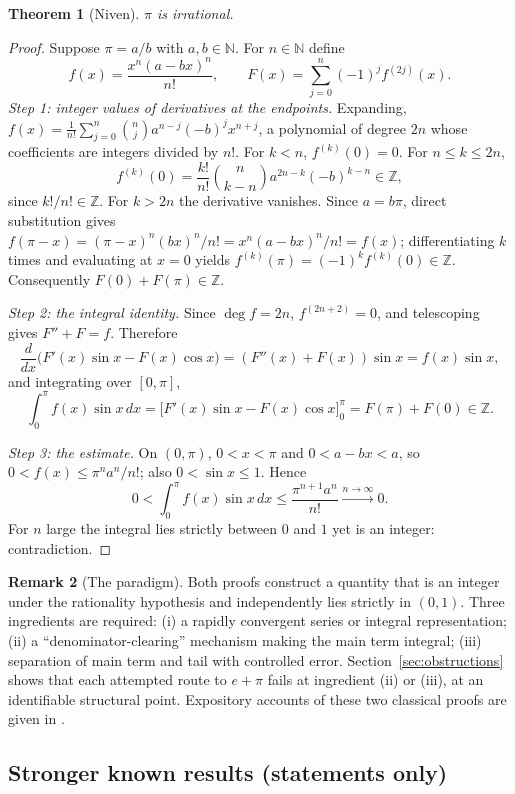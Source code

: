 \documentclass[11pt]{amsart}
\newtheorem{theorem}{Theorem}[section]
\theoremstyle{definition}
\newtheorem{remark}[theorem]{Remark}
\theoremstyle{remark}
\numberwithin{equation}{section}
\newcommand{\Z}{\mathbb{Z}}
\newcommand{\N}{\mathbb{N}}
\begin{document}
\begin{theorem}[Niven]\label{thm:niven}
$\pi$ is irrational.
\end{theorem}

\begin{proof}
Suppose $\pi=a/b$ with $a,b\in\N$. For $n\in\N$ define
\[
f(x)=\frac{x^n(a-bx)^n}{n!},\qquad F(x)=\sum_{j=0}^{n}(-1)^j f^{(2j)}(x).
\]
\emph{Step 1: integer values of derivatives at the endpoints.} Expanding, $f(x)=\frac{1}{n!}\sum_{j=0}^n\binom{n}{j}a^{n-j}(-b)^j x^{n+j}$, a polynomial of degree $2n$ whose coefficients are integers divided by $n!$. For $k<n$, $f^{(k)}(0)=0$. For $n\le k\le 2n$,
\[
f^{(k)}(0)=\frac{k!}{n!}\binom{n}{k-n}a^{2n-k}(-b)^{k-n}\in\Z,
\]
since $k!/n!\in\Z$. For $k>2n$ the derivative vanishes. Since $a=b\pi$, direct substitution gives $f(\pi-x)=(\pi-x)^n(bx)^n/n!=x^n(a-bx)^n/n!=f(x)$; differentiating $k$ times and evaluating at $x=0$ yields $f^{(k)}(\pi)=(-1)^k f^{(k)}(0)\in\Z$. Consequently $F(0)+F(\pi)\in\Z$.

\emph{Step 2: the integral identity.} Since $\deg f=2n$, $f^{(2n+2)}=0$, and telescoping gives $F''+F=f$. Therefore
\[
\frac{d}{dx}\bigl(F'(x)\sin x-F(x)\cos x\bigr)=(F''(x)+F(x))\sin x=f(x)\sin x,
\]
and integrating over $[0,\pi]$,
\[
\int_0^\pi f(x)\sin x\,dx=\bigl[F'(x)\sin x-F(x)\cos x\bigr]_0^\pi=F(\pi)+F(0)\in\Z.
\]

\emph{Step 3: the estimate.} On $(0,\pi)$, $0<x<\pi$ and $0<a-bx<a$, so $0<f(x)\le\pi^n a^n/n!$; also $0<\sin x\le1$. Hence
\[
0<\int_0^\pi f(x)\sin x\,dx\le\frac{\pi^{n+1}a^n}{n!}\xrightarrow{n\to\infty}0.
\]
For $n$ large the integral lies strictly between $0$ and $1$ yet is an integer: contradiction.
\end{proof}

\begin{remark}[The paradigm]\label{rem:paradigm}
Both proofs construct a quantity that is an integer under the rationality hypothesis and independently lies strictly in $(0,1)$. Three ingredients are required: (i) a rapidly convergent series or integral representation; (ii) a ``denominator-clearing'' mechanism making the main term integral; (iii) separation of main term and tail with controlled error. Section~\ref{sec:obstructions} shows that each attempted route to $e+\pi$ fails at ingredient (ii) or (iii), at an identifiable structural point. Expository accounts of these two classical proofs are given in \cite{Conrad}.
\end{remark}

\subsection{Stronger known results (statements only)}
\end{document}
